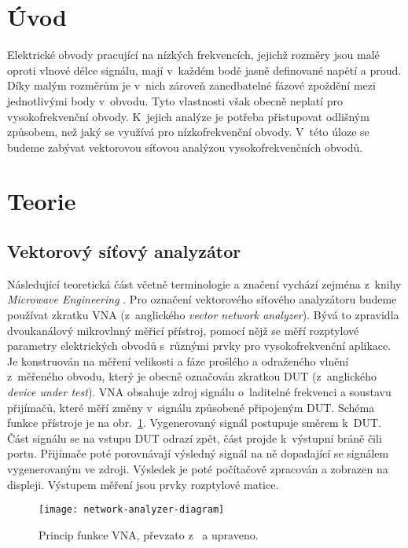\documentclass{protokol}
\begin{document}
\headernoenv

\section{Úvod}
Elektrické obvody pracující na nízkých frekvencích,
jejichž rozměry jsou malé oproti vlnové délce signálu,
mají v~každém bodě jasně definované napětí a proud.
Díky malým rozměrům je v~nich zároveň zanedbatelné fázové zpoždění
mezi jednotlivými body v~obvodu.
Tyto vlastnosti však obecně neplatí pro vysokofrekvenční obvody.
K~jejich analýze je potřeba přistupovat odlišným způsobem,
než jaký se využívá pro nízkofrekvenční obvody.
V~této úloze se budeme zabývat vektorovou síťovou analýzou vysokofrekvenčních obvodů.

\section{Teorie}

\subsection{Vektorový síťový analyzátor}

Následující teoretická část včetně terminologie a značení vychází zejména
z~knihy \emph{Microwave Engineering} \cite{pozar}.
Pro označení vektorového síťového analyzátoru budeme používat zkratku VNA
(z~anglického \emph{vector network analyzer}).
Bývá to zpravidla dvoukanálový mikrovlnný měřicí přístroj,
pomocí nějž se měří rozptylové parametry elektrických obvodů
s~různými prvky pro vysokofrekvenční aplikace.
Je konstruován na měření velikosti a fáze prošlého a odraženého vlnění
z~měřeného obvodu,
který je obecně označován zkratkou DUT (z~anglického \emph{device under test}).
VNA obsahuje zdroj signálu o~laditelné frekvenci a soustavu přijímačů,
které měří změny v~signálu způsobené připojeným DUT.
Schéma funkce přístroje je na obr.~\ref{VNA}.
Vygenerovaný signál postupuje směrem k~DUT.
Část signálu se na vstupu DUT odrazí zpět, část projde k~výstupní bráně čili portu.
Přijímače poté porovnávají výsledný signál na ně dopadající
se signálem vygenerovaným ve zdroji.
Výsledek je poté počítačově zpracován a zobrazen na displeji.
Výstupem měření jsou prvky rozptylové matice.

\begin{figure}[b]
	\centering
	\texttt{[image: network-analyzer-diagram]}
	\caption{Princip funkce VNA, převzato z~\cite{tektronix} a upraveno.}
	\label{VNA}
\end{figure}
\end{document}
